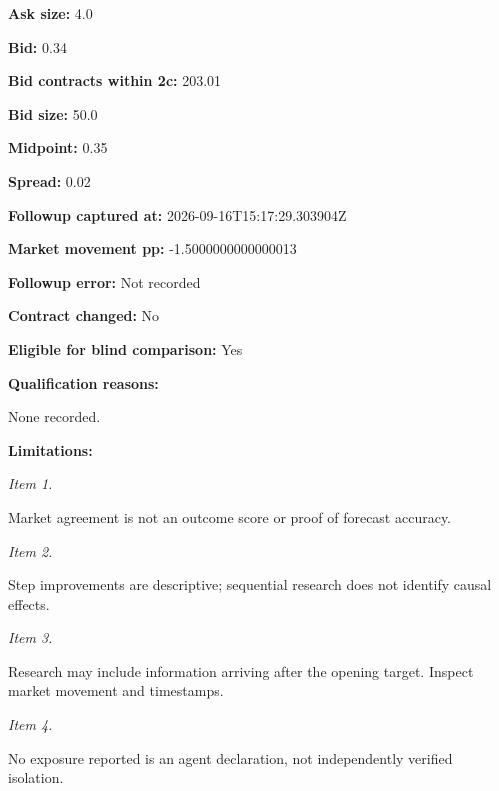 \documentclass[11pt]{article}
\begin{document}
\par\noindent\textbf{Ask size:} 4.0

\par\noindent\textbf{Bid:} 0.34

\par\noindent\textbf{Bid contracts within 2c:} 203.01

\par\noindent\textbf{Bid size:} 50.0

\par\noindent\textbf{Midpoint:} 0.35

\par\noindent\textbf{Spread:} 0.02

\par\noindent\textbf{Followup captured at:} 2026-09-16T15:17:29.303904Z

\par\noindent\textbf{Market movement pp:} -1.5000000000000013

\par\noindent\textbf{Followup error:} Not recorded

\par\noindent\textbf{Contract changed:} No

\par\noindent\textbf{Eligible for blind comparison:} Yes

\par\noindent\textbf{Qualification reasons:} \par None recorded.

\par\noindent\textbf{Limitations:} \par \par\noindent\textit{Item 1.}\par Market agreement is not an outcome score or proof of forecast accuracy.

\par\noindent\textit{Item 2.}\par Step improvements are descriptive; sequential research does not identify causal effects.

\par\noindent\textit{Item 3.}\par Research may include information arriving after the opening target. Inspect market movement and timestamps.

\par\noindent\textit{Item 4.}\par No exposure reported is an agent declaration, not independently verified isolation.
\end{document}
